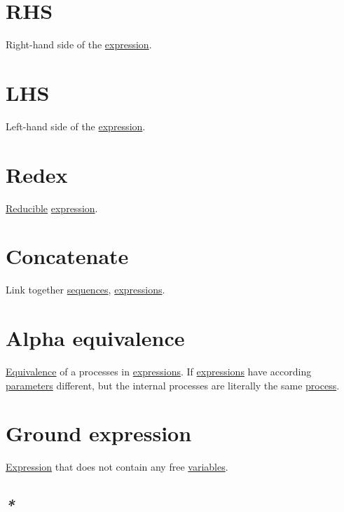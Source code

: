 \documentclass[a4paper,14pt,oneside]{book}
\begin{document}
\section{\label{org59cd42b}RHS}
\label{sec:org0170a7f}
Right-hand side of the \hyperref[org70841e3]{expression}.\\

\section{\label{org0ab3e5b}LHS}
\label{sec:org7d50fd8}
Left-hand side of the \hyperref[org70841e3]{expression}.\\

\section{\label{org3fb7eb0}Redex}
\label{sec:org380bd08}
\hyperref[org53bc87e]{Reducible} \hyperref[org70841e3]{expression}.\\

\section{\label{org42199c8}Concatenate}
\label{sec:org3c81c81}
Link together \hyperref[org10827f0]{sequences}, \hyperref[org1b8f832]{expressions}.\\

\section{\label{org6140f4e}Alpha equivalence}
\label{sec:org3bbd200}
\hyperref[orgf1e786e]{Equivalence} of a processes in \hyperref[org1b8f832]{expressions}. If \hyperref[org1b8f832]{expressions} have according \hyperref[orgd068b9c]{parameters} different, but the internal processes are literally the same \hyperref[orgfdfd3f6]{process}.\\

\section{\label{orgb2ca178}Ground expression}
\label{sec:org6667dea}
\hyperref[org70841e3]{Expression} that does not contain any free \hyperref[org4277fa3]{variables}.\\

\subsection{\emph{*}}
\label{sec:org78ae33b}
\end{document}
